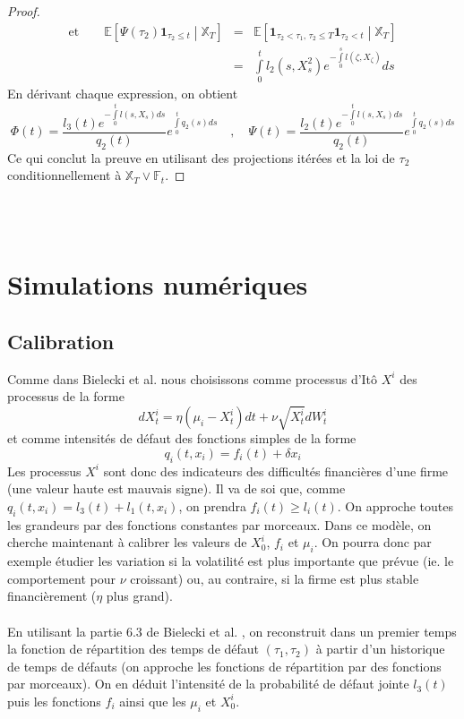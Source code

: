 \documentclass[a4paper]{article}
\theoremstyle{definition}
\theoremstyle{remark}
\begin{document}
\begin{proof}
\begin{eqnarray*}
\text{et} \qquad \mathbb{E} \left[ \Psi (\tau_2) \mathbf{1}_{\tau_2 \leq t} \middle| \mathbb{X}_T \right] &=& \mathbb{E} \left[ \mathbf{1}_{\tau_2 < \tau_1,\, \tau_2 \leq T} \mathbf{1}_{\tau_2 < t} \middle| \mathbb{X}_T \right] \\
&=& \int \limits_0^t l_2 (s, X^2_s) e^{-\int \limits_0^s l(\zeta, X_\zeta)} ds
\end{eqnarray*}
En dérivant chaque expression, on obtient
\begin{equation*}
\Phi (t) = \frac{l_3(t) e^{-\int \limits_0^t l(s, X_s)ds}}{q_2(t)}e^{\int \limits_0^t q_2 (s) ds} \quad , \quad 
\Psi(t) =  \frac{l_2(t) e^{-\int \limits_0^t l(s, X_s)ds}}{q_2(t)}e^{\int \limits_0^t q_2 (s) ds}
\end{equation*}
Ce qui conclut la preuve en utilisant des projections itérées et la loi de $\tau_2$ conditionnellement à $\mathbb{X}_T \vee \mathbb{F}_t$.
\end{proof}
~~\\\\
\section{Simulations numériques}
\subsection{Calibration}
Comme dans Bielecki et al. \cite{A} nous choisissons comme processus d'Itô $X^i$ des processus de la forme
\begin{equation*}
dX^i_t = \eta (\mu_i - X^i_t)dt + \nu \sqrt{X^i_t}dW^i_t
\end{equation*}
et comme intensités de défaut des fonctions simples de la forme
\begin{equation*}
q_i(t,x_i) = f_i(t) + \delta x_i
\end{equation*}
Les processus $X^i$ sont donc des indicateurs des difficultés financières d'une firme (une valeur haute est mauvais signe). Il va de soi que, comme $q_i(t,x_i) = l_3 (t) + l_1 (t, x_i)$, on prendra $f_i(t) \geq l_i(t)$. On approche toutes les grandeurs par des fonctions constantes par morceaux. Dans ce modèle, on cherche maintenant à calibrer les valeurs de $X_0^i$, $f_i$ et $\mu_i$. On pourra donc par exemple étudier les variation si la volatilité est plus importante que prévue (ie. le comportement pour $\nu$ croissant) ou, au contraire, si la firme est plus stable financièrement ($\eta$ plus grand). \\ \\
En utilisant la partie 6.3 de Bielecki et al. \cite{A}, on reconstruit dans un premier temps la fonction de répartition des temps de défaut $(\tau_1, \tau_2)$ à partir d'un historique de temps de défauts (on approche les fonctions de répartition par des fonctions par morceaux). On en déduit l'intensité de la probabilité de défaut jointe $l_3(t)$ puis les fonctions $f_i$ ainsi que les $\mu_i$ et $X^i_0$.
\end{document}
